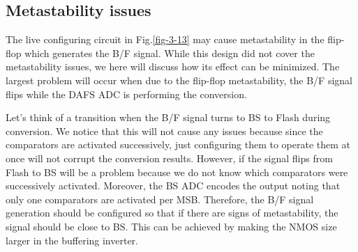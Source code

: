 \subsection{Metastability issues}
The live configuring circuit in Fig.\ref{fig-3-13} may cause metastability in the flip-flop which generates the B/F signal. While this design did not cover the metastability issues, we here will discuss how its effect can be minimized.
The largest problem will occur when due to the flip-flop metastability, the B/F signal flips while the DAFS ADC is performing the conversion. 

Let's think of a transition when the B/F signal turns to BS to Flash during conversion. 
We notice that this will not cause any issues because since the comparators are activated successively, just configuring them to operate them at once will not corrupt the conversion results.
However, if the signal flips from Flash to BS will be a problem because we do not know which comparators were successively activated. Moreover, the BS ADC encodes the output noting that only one comparators are activated per MSB. Therefore, the B/F signal generation should be configured so that if there are signs of metastability, the signal should be close to BS. This can be achieved by making the NMOS size larger in the buffering inverter. 

\color{black}



